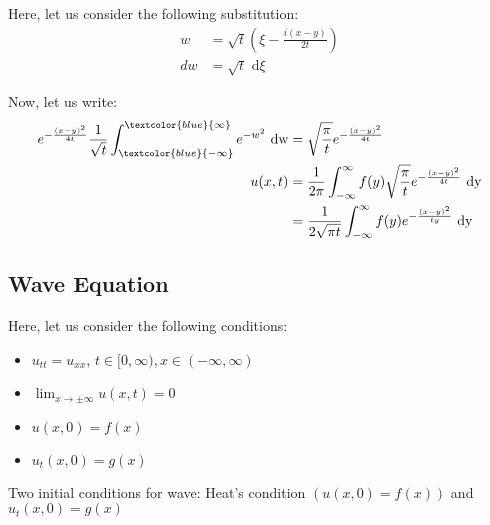 \begin{enumerate}
  Here, let us consider the following substitution:
  \color{blue}
  \begin{align}
    w & = \sqrt t \left( \xi - \frac{i(x - y)}{2t}\right)\\
    dw & = \sqrt t \text{ d}\xi
  \end{align}
  \color{black}

  Now, let us write:
  \begin{align}
    e^{- \frac{(x - y)^2}{4t}} \frac{1}{\sqrt t} \int^{\textcolor{blue}{\infty}}_{\textcolor{blue}{-\infty}} e^{-w^2} \text{ dw}
    & = \sqrt{\frac{\pi}{t}} e^{- \frac{(x - y)^2}{4t}}\\
    u(x, t) & = \frac{1}{2 \pi} \int^\infty_{- \infty} f(y) \sqrt{\frac{\pi}{t}} e^{- \frac{(x - y)^2}{4t}} \text{ dy}\\
    & = \frac{1}{2 \sqrt{\pi t}} \int^\infty_{-\infty} f(y) e^{- \frac{(x - y)^2}{ty}} \text{ dy}
  \end{align}
\end{enumerate}

\subsection{Wave Equation}


Here, let us consider the following conditions:
%
\begin{itemize}
  \item $u_{tt} = u_{xx}$, $t \in [0, \infty), x \in (-\infty, \infty)$
  \item $\displaystyle \lim_{x \to \pm \infty} u(x, t) = 0$
  \item $u(x, 0) = f(x)$
  \item $u_t(x, 0) = g(x)$
\end{itemize}

\note Two initial conditions for wave: Heat's condition $(u(x, 0) = f(x))$ and $u_t(x, 0) = g(x)$

